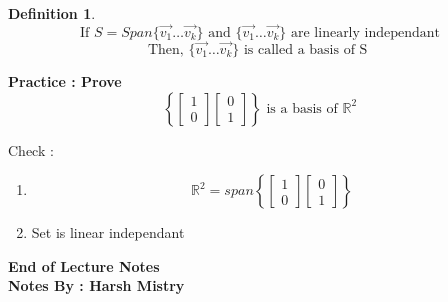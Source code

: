 \documentclass{article}
\newtheorem{definition}[theorem]{Definition}
\begin{document}
\begin{definition}
\[ \text{If } S = Span \{ \vec{v_1} \ldots \vec{v_k } \} \text{ and }  \{ \vec{v_1} \ldots \vec{v_k } \} \text{ are linearly independant} \]
\[ \text{Then, }  \{ \vec{v_1} \ldots \vec{v_k } \} \text{ is called a basis of S } \]
\end {definition}

\textbf{Practice :  Prove}
\[ \left\{ \begin{bmatrix} 1 \\ 0 \end{bmatrix} \begin{bmatrix} 0 \\ 1 \end{bmatrix} \right\} \text{ is a basis of } \mathbb{R}^2  \]

Check : 
\begin{enumerate}
  \item \[ \mathbb{R}^2 = span \left\{ \begin{bmatrix} 1 \\ 0 \end{bmatrix} \begin{bmatrix} 0 \\ 1 \end{bmatrix} \right\} \]
  \item Set is linear independant 
\end{enumerate}




\begin{center}
\textbf{End of Lecture Notes} \\
\textbf{Notes By : Harsh Mistry}
\end{center}
\end{document}
